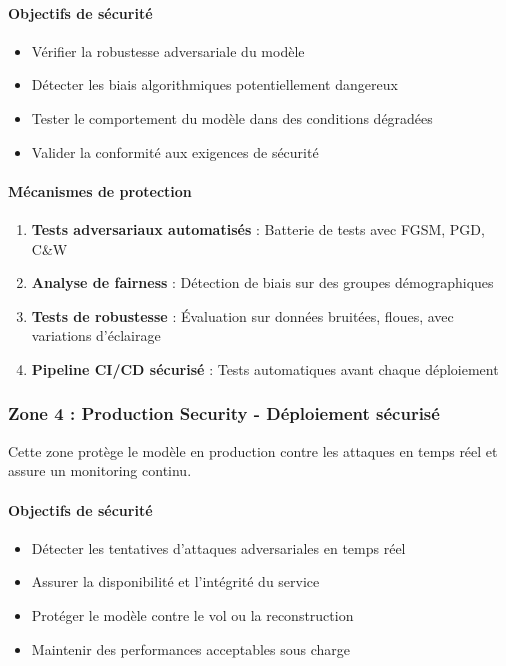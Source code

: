 \paragraph{Objectifs de sécurité}
\begin{itemize}
    \item Vérifier la robustesse adversariale du modèle
    \item Détecter les biais algorithmiques potentiellement dangereux
    \item Tester le comportement du modèle dans des conditions dégradées
    \item Valider la conformité aux exigences de sécurité
\end{itemize}

\paragraph{Mécanismes de protection}
\begin{enumerate}
    \item \textbf{Tests adversariaux automatisés} : Batterie de tests avec FGSM, PGD, C\&W
    \item \textbf{Analyse de fairness} : Détection de biais sur des groupes démographiques
    \item \textbf{Tests de robustesse} : Évaluation sur données bruitées, floues, avec variations d'éclairage
    \item \textbf{Pipeline CI/CD sécurisé} : Tests automatiques avant chaque déploiement
\end{enumerate}

\subsubsection{Zone 4 : Production Security - Déploiement sécurisé}

Cette zone protège le modèle en production contre les attaques en temps réel et assure un monitoring continu.

\paragraph{Objectifs de sécurité}
\begin{itemize}
    \item Détecter les tentatives d'attaques adversariales en temps réel
    \item Assurer la disponibilité et l'intégrité du service
    \item Protéger le modèle contre le vol ou la reconstruction
    \item Maintenir des performances acceptables sous charge
\end{itemize}

